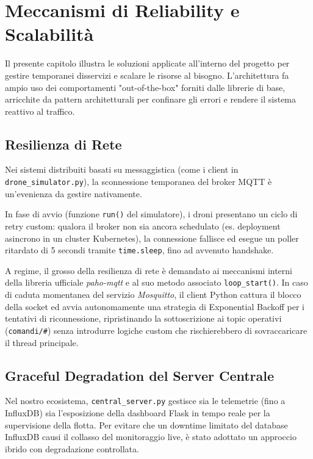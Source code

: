 
\chapter{Meccanismi di Reliability e Scalabilità}
\label{cap:reliability_scalability}

Il presente capitolo illustra le soluzioni applicate all'interno del progetto per gestire temporanei disservizi e scalare le risorse al bisogno. L'architettura fa ampio uso dei comportamenti "out-of-the-box" forniti dalle librerie di base, arricchite da pattern architetturali per confinare gli errori e rendere il sistema reattivo al traffico.

\section{Resilienza di Rete}
\label{sec:resilienza_rete}
Nei sistemi distribuiti basati su messaggistica (come i client in \texttt{drone\_simulator.py}), la sconnessione temporanea del broker MQTT è un'evenienza da gestire nativamente. 

In fase di avvio (funzione \texttt{run()} del simulatore), i droni presentano un ciclo di retry custom: qualora il broker non sia ancora schedulato (es. deployment asincrono in un cluster Kubernetes), la connessione fallisce ed esegue un poller ritardato di 5 secondi tramite \texttt{time.sleep}, fino ad avvenuto handshake. 

A regime, il grosso della resilienza di rete è demandato ai meccanismi interni della libreria ufficiale \textit{paho-mqtt} e al suo metodo associato \texttt{loop\_start()}. In caso di caduta momentanea del servizio \textit{Mosquitto}, il client Python cattura il blocco della socket ed avvia autonomamente una strategia di Exponential Backoff per i tentativi di riconnessione, ripristinando la sottoscrizione ai topic operativi (\texttt{comandi/\#}) senza introdurre logiche custom che rischierebbero di sovraccaricare il thread principale.

\section{Graceful Degradation del Server Centrale}
\label{sec:graceful_degradation}
Nel nostro ecosistema, \texttt{central\_server.py} gestisce sia le telemetrie (fino a InfluxDB) sia l'esposizione della dashboard Flask in tempo reale per la supervisione della flotta. Per evitare che un downtime limitato del database InfluxDB causi il collasso del monitoraggio live, è stato adottato un approccio ibrido con degradazione controllata.

